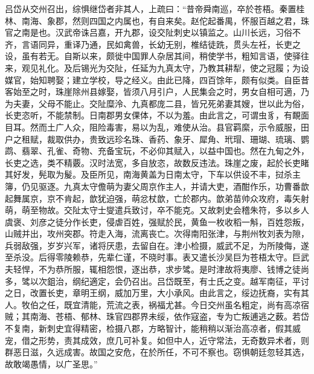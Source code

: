 \documentclass[12pt,UTF8]{ctexbook}
\begin{document}
吕岱从交州召出，综惧继岱者非其人，上疏曰：“昔帝舜南巡，卒於苍梧。秦置桂林、南海、象郡，然则四国之内属也，有自来矣。赵佗起番禺，怀服百越之君，珠官之南是也。汉武帝诛吕嘉，开九郡，设交阯刺史以镇监之。山川长远，习俗不齐，言语同异，重译乃通，民如禽兽，长幼无别，椎结徒跣，贯头左衽，长吏之设，虽有若无。自斯以来，颇徙中国罪人杂居其间，稍使学书，粗知言语，使驿往来，观见礼化。及后锡光为交阯，任延为九真太守，乃教其耕犁，使之冠履；为设媒官，始知聘娶；建立学校，导之经义。由此已降，四百馀年，颇有似类。自臣昔客始至之时，珠崖除州县嫁娶，皆须八月引户，人民集会之时，男女自相可適，乃为夫妻，父母不能止。交阯糜泠、九真都庞二县，皆兄死弟妻其嫂，世以此为俗，长吏恣听，不能禁制。日南郡男女倮体，不以为羞。由此言之，可谓虫豸，有靦面目耳。然而土广人众，阻险毒害，易以为乱，难使从治。县官羁縻，示令威服，田户之租赋，裁取供办，贵致远珍名珠、香药、象牙、犀角、玳瑁、珊瑚、琉璃、鹦鹉、翡翠、孔雀、奇物、充备宝玩，不必仰其赋入，以益中国也。然在九甸之外，长吏之选，类不精覈。汉时法宽，多自放恣，故数反违法。珠崖之废，起於长吏睹其好发，髡取为髲。及臣所见，南海黄盖为日南太守，下车以供设不丰，挝杀主簿，仍见驱逐。九真太守儋萌为妻父周京作主人，并请大吏，酒酣作乐，功曹番歆起舞属京，京不肯起，歆犹迫强，萌忿杖歆，亡於郡内。歆弟苗帅众攻府，毒矢射萌，萌至物故。交阯太守士燮遣兵致讨，卒不能克。又故刺史会稽朱符，多以乡人虞褒、刘彦之徒分作长吏，侵虐百姓，强赋於民，黄鱼一枚收稻一斛，百姓怨叛，山贼并出，攻州突郡。符走入海，流离丧亡。次得南阳张津，与荆州牧刘表为隙，兵弱敌强，岁岁兴军，诸将厌患，去留自在。津小检摄，威武不足，为所陵侮，遂至杀没。后得零陵赖恭，先辈仁谨，不晓时事。表又遣长沙吴巨为苍梧太守。巨武夫轻悍，不为恭所服，辄相怨恨，逐出恭，求步骘。是时津故将夷廖、钱博之徒尚多，骘以次鉏治，纲纪適定，会仍召出。吕岱既至，有士氏之变。越军南征，平讨之日，改置长吏，章明王纲，威加万里，大小承风。由此言之，绥边抚裔，实有其人。牧伯之任，既宜清能，荒流之表，祸福尤甚。今日交州虽名粗定，尚有高凉宿贼；其南海、苍梧、郁林、珠官四郡界未绥，依作寇盗，专为亡叛逋逃之薮。若岱不复南，新刺史宜得精密，检摄八郡，方略智计，能稍稍以渐治高凉者，假其威宠，借之形势，责其成效，庶几可补复。如但中人，近守常法，无奇数异术者，则群恶日滋，久远成害。故国之安危，在於所任，不可不察也。窃惧朝廷忽轻其选，故敢竭愚情，以广圣思。”
\end{document}
